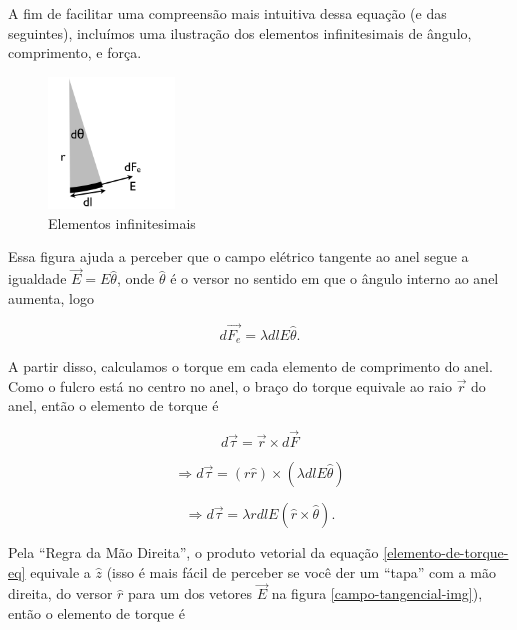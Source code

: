 \documentclass[
	article,
	11pt,
	oneside,
	a4paper,
	english,
	brazil,
	sumario=tradicional
	]{abntex2}
\begin{document}
A fim de facilitar uma compreensão mais intuitiva dessa equação (e das seguintes), incluímos uma ilustração dos elementos infinitesimais de ângulo, comprimento, e força.

\begin{figure}[htb]\label{elementos-infinitesimais-img}
    \caption{Elementos infinitesimais}
    \centering
    \includegraphics[width=0.3\textwidth]{elementos_infinitesimais.png}
\end{figure}

Essa figura ajuda a perceber que o campo elétrico tangente ao anel segue a igualdade $\vec{E} = E \hat{\theta}$, onde $\hat{\theta}$ é o versor no sentido em que o ângulo interno ao anel aumenta, logo

\begin{equation}
    d \vec{F_e} =  \lambda dl E \hat{\theta}.
\end{equation}

A partir disso, calculamos o torque em cada elemento de comprimento do anel. Como o fulcro está no centro no anel, o braço do torque equivale ao raio $\vec{r}$ do anel, então o elemento de torque é

\begin{equation}
    d \vec{\tau} = \vec{r} \times d\vec{F}
\end{equation}

\begin{equation}
    \Rightarrow d \vec{\tau} = \left(r \hat{r}\right) \times \left(\lambda dl E \hat{\theta}\right)
\end{equation}

\begin{equation} \label{elemento-de-torque-eq}
    \Rightarrow d \vec{\tau} = \lambda r dl E \left(\hat{r} \times \hat{\theta}\right).
\end{equation}

Pela ``Regra da Mão Direita'', o produto vetorial da equação \ref{elemento-de-torque-eq} equivale a $\hat{z}$ (isso é mais fácil de perceber se você der um ``tapa'' com a mão direita, do versor $\hat{r}$ para um dos vetores $\vec{E}$ na figura \ref{campo-tangencial-img}), então o elemento de torque é
\end{document}
